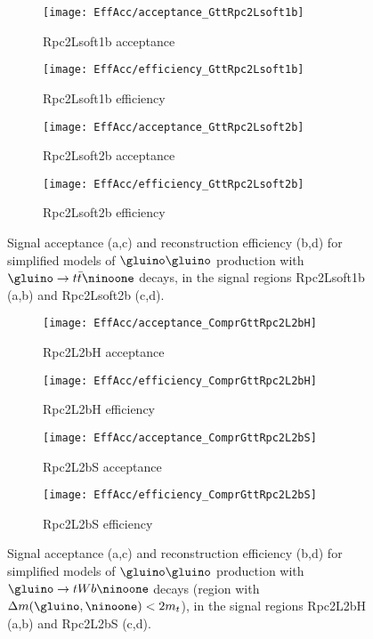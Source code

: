 \begin{figure}[ht]
\centering
\begin{subfigure}[t]{0.49\textwidth}\texttt{[image: EffAcc/acceptance\_GttRpc2Lsoft1b]}\caption{Rpc2Lsoft1b acceptance}\end{subfigure}
\begin{subfigure}[t]{0.49\textwidth}\texttt{[image: EffAcc/efficiency\_GttRpc2Lsoft1b]}\caption{Rpc2Lsoft1b efficiency}\end{subfigure}
\begin{subfigure}[t]{0.49\textwidth}\texttt{[image: EffAcc/acceptance\_GttRpc2Lsoft2b]}\caption{Rpc2Lsoft2b acceptance}\end{subfigure}
\begin{subfigure}[t]{0.49\textwidth}\texttt{[image: EffAcc/efficiency\_GttRpc2Lsoft2b]}\caption{Rpc2Lsoft2b efficiency}\end{subfigure}
\caption{Signal acceptance (a,c) and reconstruction efficiency (b,d) 
for simplified models of $\gluino\gluino$ production with $\gluino\to t\bar t\ninoone$ decays, 
in the signal regions Rpc2Lsoft1b (a,b) and Rpc2Lsoft2b (c,d).}
\end{figure}

\begin{figure}[ht]
\centering
\begin{subfigure}[t]{0.49\textwidth}\texttt{[image: EffAcc/acceptance\_ComprGttRpc2L2bH]}\caption{Rpc2L2bH acceptance}\end{subfigure}
\begin{subfigure}[t]{0.49\textwidth}\texttt{[image: EffAcc/efficiency\_ComprGttRpc2L2bH]}\caption{Rpc2L2bH efficiency}\end{subfigure}
\begin{subfigure}[t]{0.49\textwidth}\texttt{[image: EffAcc/acceptance\_ComprGttRpc2L2bS]}\caption{Rpc2L2bS acceptance}\end{subfigure}
\begin{subfigure}[t]{0.49\textwidth}\texttt{[image: EffAcc/efficiency\_ComprGttRpc2L2bS]}\caption{Rpc2L2bS efficiency}\end{subfigure}
\caption{Signal acceptance (a,c) and reconstruction efficiency (b,d) 
for simplified models of $\gluino\gluino$ production with $\gluino\to tWb\ninoone$ decays (region with $\Delta m(\gluino,\ninoone)<2m_t$), 
in the signal regions Rpc2L2bH (a,b) and Rpc2L2bS (c,d).}
\end{figure}

